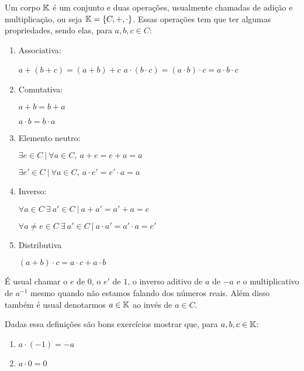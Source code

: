 \begin{defn}

Um corpo $\mathbb{K}$ é um conjunto e duas operações, usualmente chamadas de adição e multiplicação, ou seja $\mathbb{K} = \{C, +, \cdot\}$. Essas operações tem que ter algumas propriedades, sendo elas, para $a,b,c \in C$:

\begin{enumerate}
    \item Associativa:
    
        $a + (b + c) = (a + b) + c$
        $a \cdot (b \cdot c) = (a \cdot b) \cdot c = a \cdot b \cdot c$
        
    \item Comutativa:
    
    $a + b = b + a$
    
    $a \cdot b = b \cdot a$
    
    \item Elemento neutro:
    
    $\exists  e \in C \ | \ \forall a \in C, \ a + e = e + a = a$
    
    $\exists  e' \in C \ | \ \forall a \in C, \ a \cdot e' = e' \cdot a = a$
 
    \item Inverso:
    
   $\forall a \in C \ \exists \ a' \in C \ | \ a + a' = a' + a = e$
 
    $\forall a \ne e \in C \ \exists \ a' \in C \ | \ a \cdot a' = a' \cdot a= e'$
 
    \item Distributiva 
    
    $(a + b) \cdot c = a \cdot c + a \cdot b$
\end{enumerate}

É usual chamar o $e$ de $0$, o \textbf{$e'$} de $1$, o inverso aditivo de $a$ de $-a$ e o multiplicativo de $a^{-1}$ mesmo quando não estamos falando dos números reais. Além disso também é usual denotarmos $ a \in \mathbb{K} $ ao invés de  $a \in C$.

\end{defn}

Dadas essa definições são bons exercícios mostrar que, para $a,b,c \in \mathbb{K} $:
\begin{enumerate}
    \item $a \cdot (-1) = -a$
    \item $a \cdot 0 = 0$
\end{enumerate}



